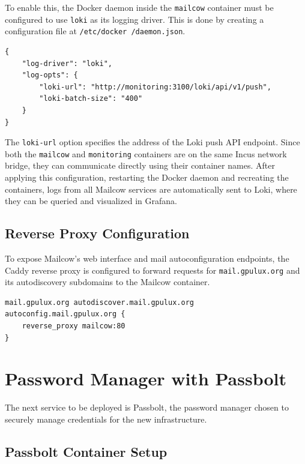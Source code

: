 To enable this, the Docker daemon inside the \texttt{mailcow} container must be configured to use \texttt{loki} as its logging driver. This is done by creating a configuration file at \texttt{/etc/docker /daemon.json}\cite{loki-docker-driver-config}.

\begin{lstlisting}[caption={Docker daemon configuration enabling the Loki logging driver}]
{
    "log-driver": "loki",
    "log-opts": {
        "loki-url": "http://monitoring:3100/loki/api/v1/push",
        "loki-batch-size": "400"
    }
}
\end{lstlisting}

The \texttt{loki-url} option specifies the address of the Loki push API endpoint. Since both the \texttt{mailcow} and \texttt{monitoring} containers are on the same Incus network bridge, they can communicate directly using their container names. After applying this configuration, restarting the Docker daemon and recreating the containers, logs from all Mailcow services are automatically sent to Loki, where they can be queried and visualized in Grafana.

\subsection*{Reverse Proxy Configuration}

To expose Mailcow's web interface and mail autoconfiguration endpoints, the Caddy reverse proxy is configured to forward requests for \texttt{mail.gpulux.org} and its autodiscovery subdomains to the Mailcow container.

\begin{lstlisting}[caption={Caddyfile configuration used to expose Mailcow via the reverse proxy}]
mail.gpulux.org autodiscover.mail.gpulux.org autoconfig.mail.gpulux.org {
    reverse_proxy mailcow:80
}
\end{lstlisting}

\section{Password Manager with Passbolt}

The next service to be deployed is Passbolt, the password manager chosen to securely manage credentials for the new infrastructure.

\subsection*{Passbolt Container Setup}

